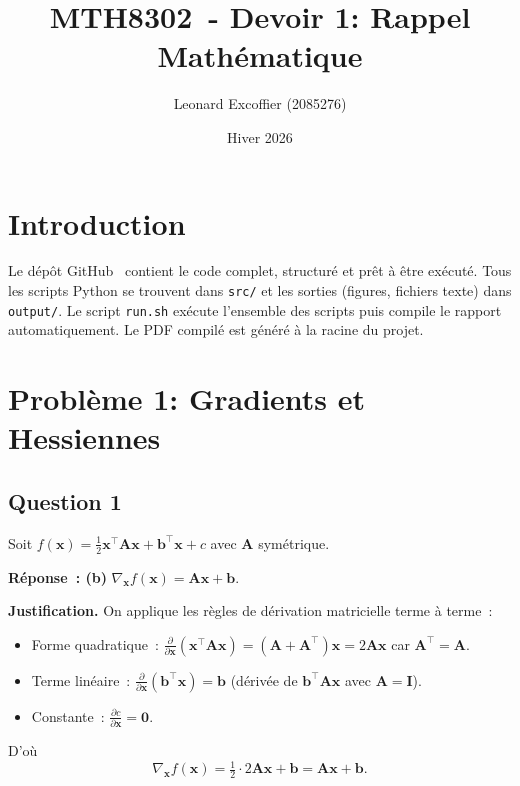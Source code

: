 \documentclass[12pt,letterpaper]{article}
\title{MTH8302~- Devoir 1: Rappel Mathématique}
\author{Leonard Excoffier (2085276)}
\date{Hiver 2026}
\begin{document}
\maketitle

\tableofcontents

\section*{Introduction}

Le dépôt GitHub~\cite{repo} contient le code complet, structuré et prêt à être exécuté.
Tous les scripts Python se trouvent dans \texttt{src/} et les sorties (figures, fichiers texte) dans \texttt{output/}.
Le script \texttt{run.sh} exécute l'ensemble des scripts puis compile le rapport automatiquement.
Le PDF compilé est généré à la racine du projet.

\section{Problème 1: Gradients et Hessiennes}

\subsection{Question 1}

Soit $f(\mathbf{x}) = \frac{1}{2}\mathbf{x}^\top \mathbf{A}\mathbf{x} + \mathbf{b}^\top\mathbf{x} + c$ avec $\mathbf{A}$ symétrique.

\textbf{Réponse~: (b)} $\nabla_{\mathbf{x}} f(\mathbf{x}) = \mathbf{A}\mathbf{x} + \mathbf{b}$.

\textbf{Justification.}
On applique les règles de dérivation matricielle terme à terme~:
\begin{itemize}
  \item Forme quadratique~: $\frac{\partial}{\partial \mathbf{x}}(\mathbf{x}^\top\mathbf{A}\mathbf{x}) = (\mathbf{A} + \mathbf{A}^\top)\mathbf{x} = 2\mathbf{A}\mathbf{x}$ car $\mathbf{A}^\top = \mathbf{A}$.
  \item Terme linéaire~: $\frac{\partial}{\partial \mathbf{x}}(\mathbf{b}^\top\mathbf{x}) = \mathbf{b}$ (dérivée de $\mathbf{b}^\top\mathbf{A}\mathbf{x}$ avec $\mathbf{A} = \mathbf{I}$).
  \item Constante~: $\frac{\partial c}{\partial \mathbf{x}} = \mathbf{0}$.
\end{itemize}
D'où
\[
\nabla_{\mathbf{x}} f(\mathbf{x}) = \tfrac{1}{2}\cdot 2\mathbf{A}\mathbf{x} + \mathbf{b} = \boxed{\mathbf{A}\mathbf{x} + \mathbf{b}}.
\]
\end{document}
